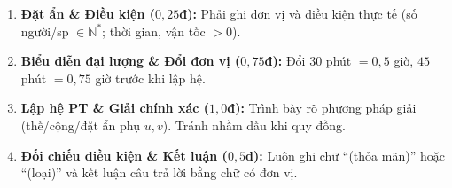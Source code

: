 \documentclass[11pt,a4paper]{article}
\begin{document}
\vspace{0.5mm}

\begin{khungluuy}
\begin{enumerate}[leftmargin=*,itemsep=0.3pt,topsep=0pt]
  \item \textbf{Đặt ẩn \& Điều kiện ($0{,}25$đ):} Phải ghi đơn vị và điều kiện thực tế (số người/sp $\in \mathbb{N}^*$; thời gian, vận tốc $>0$).
  \item \textbf{Biểu diễn đại lượng \& Đổi đơn vị ($0{,}75$đ):} Đổi $30$ phút $= 0{,}5$ giờ, $45$ phút $= 0{,}75$ giờ trước khi lập hệ.
  \item \textbf{Lập hệ PT \& Giải chính xác ($1{,}0$đ):} Trình bày rõ phương pháp giải (thế/cộng/đặt ẩn phụ $u, v$). Tránh nhầm dấu khi quy đồng.
  \item \textbf{Đối chiếu điều kiện \& Kết luận ($0{,}5$đ):} Luôn ghi chữ ``(thỏa mãn)'' hoặc ``(loại)'' và kết luận câu trả lời bằng chữ có đơn vị.
\end{enumerate}
\end{khungluuy}
\end{document}
